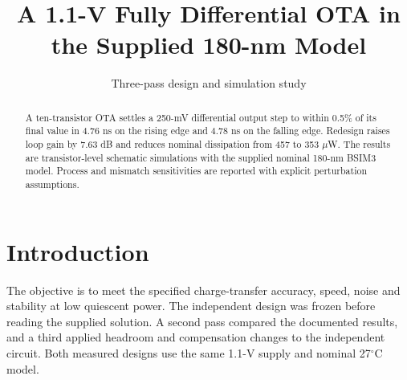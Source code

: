 \documentclass[10pt,journal]{IEEEtran}
\begin{document}
\title{A 1.1-V Fully Differential OTA in the Supplied 180-nm Model}
\author{Three-pass design and simulation study}
\maketitle
\begin{abstract}
A ten-transistor OTA settles a 250-mV differential output step to within 0.5\% of its final value in 4.76 ns on the rising edge and 4.78 ns on the falling edge. Redesign raises loop gain by 7.63 dB and reduces nominal dissipation from 457 to 353 $\mu$W. The results are transistor-level schematic simulations with the supplied nominal 180-nm BSIM3 model. Process and mismatch sensitivities are reported with explicit perturbation assumptions.
\end{abstract}
\section{Introduction}
The objective is to meet the specified charge-transfer accuracy, speed, noise and stability at low quiescent power. The independent design was frozen before reading the supplied solution. A second pass compared the documented results, and a third applied headroom and compensation changes to the independent circuit. Both measured designs use the same 1.1-V supply and nominal 27$^\circ$C model.
\end{document}

